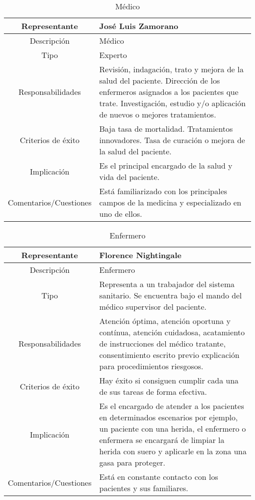 \documentclass[12pt, spanish]{article}
\begin{document}
\renewcommand{\arraystretch}{1.5}
\begin{longtable}{|c|p{.65\linewidth}|}
   \caption{Médico} \\
   \hline
   Representante & José Luis Zamorano \\
   \hline
   Descripción & Médico \\
   \hline
   Tipo & Experto \\
   \hline
   Responsabilidades & Revisión, indagación, trato y mejora de la salud del paciente. Dirección de los enfermeros asignados a los pacientes que trate. Investigación, estudio y/o aplicación de nuevos o mejores tratamientos. \\
   \hline
   Criterios de éxito & Baja tasa de mortalidad. Tratamientos innovadores. Tasa de curación o mejora de la salud del paciente. \\
   \hline
   Implicación & Es el principal encargado de la salud y vida del paciente. \\
   \hline
   Comentarios/Cuestiones & Está familiarizado con los principales campos de la medicina y especializado en uno de ellos. \\
   \hline
\end{longtable}


\begin{longtable}{|c|p{.65\linewidth}|}
   \caption{Enfermero} \\
   \hline
   Representante & Florence Nightingale \\
   \hline
   Descripción & Enfermero \\
   \hline
   Tipo & Representa a un trabajador del sistema sanitario. Se encuentra bajo el mando del médico supervisor del paciente. \\
   \hline
   Responsabilidades & Atención óptima, atención oportuna y contínua, atención cuidadosa, acatamiento de instrucciones del médico tratante, consentimiento escrito previo explicación para procedimientos riesgosos. \\
   \hline
   Criterios de éxito & Hay éxito si consiguen cumplir cada una de sus tareas de forma efectiva. \\
   \hline
   Implicación & Es el encargado de atender a los pacientes en determinados escenarios por ejemplo, un paciente con una herida, el enfermero o enfermera se encargará de limpiar la herida con suero y aplicarle en la zona una gasa para proteger. \\
   \hline
   Comentarios/Cuestiones & Está en constante contacto con los pacientes y sus familiares. \\
   \hline
\end{longtable}
\end{document}
